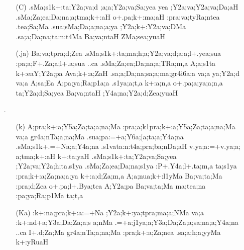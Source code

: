 \begin{itemize} 
\item[]		 \begin{itemize}         
          \item[({\sktf C})] {\sktf .sMa;s1k+:ta;Y2a;va;d%
;a;a;Y2a;va;Sa;yea yea ;Y2a;va;Y2a;va;Da;aH
.sMa;Za;ea;Da;na;a;tma;k+:aH o+.pa;k+:ma;aH
:pra;va;tyRa;ntea\ZF{,} .tea;Sa;Ma .sua;sMa;Da;a;na;a;ya ;Y2a;k+:Y2a;va;DMa .sa;a;Da;na;ta:n:t4Ma
Ba;va;ntaH ZMa;sea;yuaH}
          
          \item[({\sktf .ja})] {\sktf Ba;va;tpra;d;Zea
.sMa;s1k+:ta;ma;h;a;Y2a;va;d;a;a;l+.yea;sua
:pa;a;F+.Za;a;l+.a;sua ..ca .sMa;Za;ea;Da;na;a;TRa;m,a
A;a;s1ta k+:eaY;Y2a;pa Ava;k+:a;ZaH .sa;a;Da;na;sa;a;ma;gr4i6a;a va;a  ya;Y2a;d va;a
A;sa;Ea A;pa;ya;Ra;p1a;a .s1ya;a;t,a\ZF{,} k+:a;n,a o+.pa;a;ya;a;n,a
ta;Y2a;d;Sa;yea Ba;va;ntaH ;Y4a;na;Y2a;d;Zea;yuaH%
}
          
         \end{itemize}


\item[{\sktf 24}.] \begin{itemize}
           
          \item[({\sktf k})] {\sktf A;pra;k+:a;Y5a;Za;ta;a;na;Ma
:pra;a;k1pra;k+:a;Y5a;Za;ta;a;na;Ma va;a gr4a;nTa;a;na;Ma
.sua;pa:=+a;Y6a;[a;ta;a;Y4a;na .sMa;s1k+.=+Na;a;Y4a;na\ZF{,} {.s1va}{ta}:n:t4a;pra;ba;nDa;aH\ZF{,} v.ya;a:=+v.ya;a;%
a;tma;k+:aH} {\sktf k+:ta;yaH%
\ZF{-}} {\sktf
.sMa;s1k+:ta;Y2a;va;Sa;yea ;Y2a;va;Y2a;h{;ta}{.s1ya} .sMa;Za;ea;Da;na;s1ya :P+.Y4a;l+.ta;m,a\ZF{,} ta;s1ya
:pra;k+:a;Za;na;a;ya k+:a;d;Za;m,a
A;a;nua;k+:l1yMa Ba;va;ta;Ma :pra;d;Zea
o+.pa;l+.Bya;tea A;Y2a;pa Ba;va;ta;Ma ma;tea;na :pa;ya;Ra;p1Ma ta;t,a} 
           
          \item[({\sktf Ka})] {\sktf :k+:na;pra;k+:a:=+Na
;Y2a;k+:ya;tpra;ma;a;NMa va;a :k+:nd+a;Y3a;Da;Za;a;s%
a;nMa .=+a:j1ya;a;Y3a;Da;Za;a;sa;na;a;Y4a;na ..ca I+.d;Za;Ma gr4a;nTa;a;na;Ma :pra;k+:a;Za;nea .sa;a;h;a;yyMa k+:yRuaH%
} 
          

\end{itemize}
\end{itemize}
